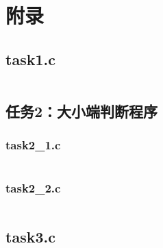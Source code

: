 \documentclass[12pt, a4paper]{academics}
\begin{document}
\appendix
\section{附录}

\subsection{task1.c}

\inputminted{c}{../src/task1.c}

\subsection{任务2：大小端判断程序}

\subsubsection{task2\_1.c}

\inputminted{c}{../src/task2_1.c}

\subsubsection{task2\_2.c}

\inputminted{c}{../src/task2_2.c}

\subsection{task3.c}

\inputminted{c}{../src/task3.c}
\end{document}

